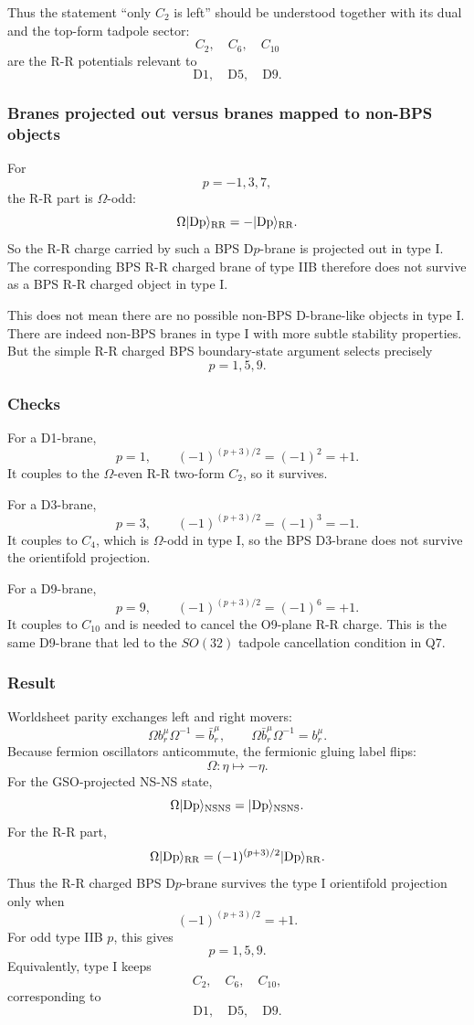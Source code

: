 \documentclass[
  10pt,
  a4paper,
  openany]{book}
\begin{document}
Thus the statement ``only \(C_2\) is left'' should be understood
together with its dual and the top-form tadpole sector: \[
C_2,\quad C_6,\quad C_{10}
\] are the R-R potentials relevant to \[
\mathrm{D1},\quad \mathrm{D5},\quad \mathrm{D9}.
\]

\subsubsection{Branes projected out versus branes mapped to non-BPS
objects}\label{branes-projected-out-versus-branes-mapped-to-non-bps-objects}

For \[
p=-1,3,7,
\] the R-R part is \(\Omega\)-odd: \[
\Omega |{\rm Dp}\rangle_{\mathrm{RR}}
=
-
|{\rm Dp}\rangle_{\mathrm{RR}}.
\] So the R-R charge carried by such a BPS D\(p\)-brane is projected out
in type I. The corresponding BPS R-R charged brane of type IIB therefore
does not survive as a BPS R-R charged object in type I.

This does not mean there are no possible non-BPS D-brane-like objects in
type I. There are indeed non-BPS branes in type I with more subtle
stability properties. But the simple R-R charged BPS boundary-state
argument selects precisely \[
p=1,5,9.
\]

\subsubsection{Checks}\label{checks-7}

For a D1-brane, \[
p=1,
\qquad
(-1)^{(p+3)/2}
=
(-1)^2
=
+1.
\] It couples to the \(\Omega\)-even R-R two-form \(C_2\), so it
survives.

For a D3-brane, \[
p=3,
\qquad
(-1)^{(p+3)/2}
=
(-1)^3
=
-1.
\] It couples to \(C_4\), which is \(\Omega\)-odd in type I, so the BPS
D3-brane does not survive the orientifold projection.

For a D9-brane, \[
p=9,
\qquad
(-1)^{(p+3)/2}
=
(-1)^6
=
+1.
\] It couples to \(C_{10}\) and is needed to cancel the O9-plane R-R
charge. This is the same D9-brane that led to the \(SO(32)\) tadpole
cancellation condition in Q7.

\subsubsection{Result}\label{result-11}

Worldsheet parity exchanges left and right movers: \[
\Omega b_r^\mu\Omega^{-1}=\bar b_r^\mu,
\qquad
\Omega\bar b_r^\mu\Omega^{-1}=b_r^\mu.
\] Because fermion oscillators anticommute, the fermionic gluing label
flips: \[
\Omega:
\eta\mapsto -\eta.
\] For the GSO-projected NS-NS state, \[
\Omega |{\rm Dp}\rangle_{\mathrm{NSNS}}
=
|{\rm Dp}\rangle_{\mathrm{NSNS}}.
\] For the R-R part, \[
\Omega |{\rm Dp}\rangle_{\mathrm{RR}}
=
(-1)^{(p+3)/2}
|{\rm Dp}\rangle_{\mathrm{RR}}.
\] Thus the R-R charged BPS D\(p\)-brane survives the type I orientifold
projection only when \[
(-1)^{(p+3)/2}=+1.
\] For odd type IIB \(p\), this gives \[
\boxed{
p=1,5,9.
}
\] Equivalently, type I keeps \[
C_2,\quad C_6,\quad C_{10},
\] corresponding to \[
\boxed{
\mathrm{D1},\quad \mathrm{D5},\quad \mathrm{D9}.
}
\]
\end{document}
